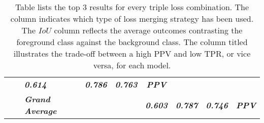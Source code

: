 \begin{table}[H]
{\begin{tabular}{cc|l|cc|c|c|c|c|}
     &
     &
    \textit{\textbf{0.614}} &
    \textit{\textbf{0.786}} &
    \textit{\textbf{0.763}} &
    \textit{\textbf{PPV}} \\ \cline{3-3} \cline{6-9} 
   &
     &
    \textit{\textbf{Grand Average}} &
     &
     &
    \textit{\textbf{0.603}} &
    \textit{\textbf{0.787}} &
    \textit{\textbf{0.746}} &
    \textit{\textbf{PPV}} \\ \cline{3-3} \cline{6-9}  
  \end{tabular}%
  }
  \caption[Top triple discrete loss combination results (Skin Lesion)]{Table lists the top 3 results for every triple loss combination. The column  indicates which type of loss merging strategy has been used. The $IoU$ column reflects the average outcomes contrasting the foreground class against the background class. The column titled  illustrates the trade-off between a high \acf{PPV} and low \acf{TPR}, or vice versa, for each model.}
  \label{tab:loss_combination_results_melanoma_triple_long}
  \end{table}